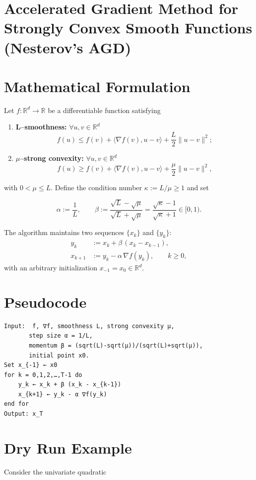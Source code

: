\documentclass{article}
\begin{document}
\section*{Accelerated Gradient Method for Strongly Convex Smooth Functions (Nesterov’s AGD)}

\section*{Mathematical Formulation}
Let $f:\mathbb{R}^{d}\rightarrow\mathbb{R}$ be a differentiable function satisfying  

\begin{enumerate}[label=(\alph*)]
    \item \textbf{L–smoothness:}  $\forall u,v\in\mathbb{R}^{d}$
    \[
    f(u)\le f(v)+\langle\nabla f(v),u-v\rangle+\frac{L}{2}\|u-v\|^{2};
    \tag{1}
    \]
    \item \textbf{$\mu$–strong convexity:} $\forall u,v\in\mathbb{R}^{d}$
    \[
    f(u)\ge f(v)+\langle\nabla f(v),u-v\rangle+\frac{\mu}{2}\|u-v\|^{2},
    \tag{2}
    \]
\end{enumerate}
with $0<\mu\le L$.  
Define the condition number $\kappa:=L/\mu\ge 1$ and set  

\[
\alpha:=\frac{1}{L},\qquad 
\beta:=\frac{\sqrt{L}-\sqrt{\mu}}{\sqrt{L}+\sqrt{\mu}}
      =\frac{\sqrt{\kappa}-1}{\sqrt{\kappa}+1}\in[0,1).
\tag{3}
\]

The algorithm maintains two sequences $\{x_{k}\}$ and $\{y_{k}\}$:
\[
\boxed{
\begin{aligned}
y_{k}      &:= x_{k}+ \beta\,(x_{k}-x_{k-1}),\\[2mm]
x_{k+1}    &:= y_{k}-\alpha\,\nabla f(y_{k}),\qquad k\ge 0,
\end{aligned}}
\tag{4}
\]
with an arbitrary initialization $x_{-1}=x_{0}\in\mathbb{R}^{d}$.

\section*{Pseudocode}
\begin{verbatim}
Input:  f, ∇f, smoothness L, strong convexity μ,
       step size α = 1/L,
       momentum β = (sqrt(L)-sqrt(μ))/(sqrt(L)+sqrt(μ)),
       initial point x0.
Set x_{-1} ← x0
for k = 0,1,2,…,T-1 do
    y_k ← x_k + β (x_k - x_{k-1})
    x_{k+1} ← y_k - α ∇f(y_k)
end for
Output: x_T
\end{verbatim}

\section*{Dry Run Example}
Consider the univariate quadratic  
\end{document}
